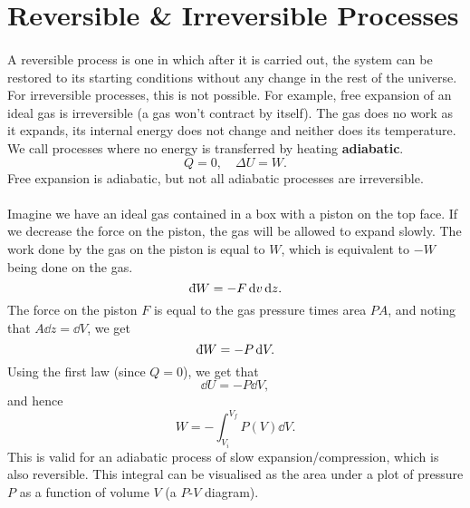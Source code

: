 \documentclass[../thermodynamics.tex]{subfiles}
\begin{document}
    \section{Reversible \& Irreversible Processes}
        \paragraph{}
        A reversible process is one in which after it is carried out, the system can be restored to its starting conditions without any change in the rest of the universe.
        For irreversible processes, this is not possible.
        For example, free expansion of an ideal gas is irreversible (a gas won't contract by itself).
        The gas does no work as it expands, its internal energy does not change and neither does its temperature.
        We call processes where no energy is transferred by heating \textbf{adiabatic}.
        \begin{equation}
            Q=0,\quad\Delta U=W.
        \end{equation}
        Free expansion is adiabatic, but not all adiabatic processes are irreversible.

        \paragraph{}
        Imagine we have an ideal gas contained in a box with a piston on the top face.
        If we decrease the force on the piston, the gas will be allowed to expand slowly.
        The work done by the gas on the piston is equal to $W$, which is equivalent to $-W$ being done on the gas.
        \begin{equation}
            \dbar{W}=-F\dd{v}\dd{z}.
        \end{equation}
        The force on the piston $F$ is equal to the gas pressure times area $PA$, and noting that $A\dd{z}=\dd{V}$, we get
        \begin{equation}
            \dbar{W}=-P\dd{V}.
        \end{equation}
        Using the first law (since $Q=0$), we get that
        \begin{equation}
            \dd{U}=-P\dd{V},
        \end{equation}
        and hence
        \begin{equation}
            W=-\int_{V_i}^{V_f}P(V)\dd{V}.
        \end{equation}
        This is valid for an adiabatic process of slow expansion/compression, which is also reversible.
        This integral can be visualised as the area under a plot of pressure $P$ as a function of volume $V$ (a $P$-$V$ diagram).
\end{document}
